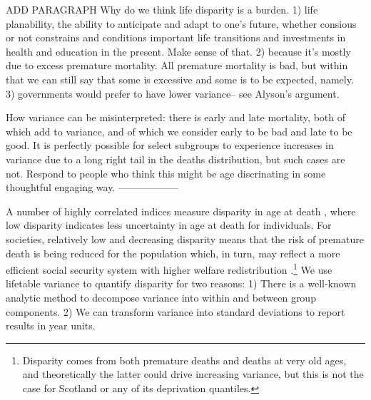 \documentclass[12pt,oneside,a4paper]{article} %
\theoremstyle{definition}
\begin{document}
ADD PARAGRAPH
Why do we think life disparity is a burden. 1) life planability, the ability to
anticipate and adapt to one's future, whether consious or not constrains and
conditions important life transitions and investments in health and education in
the present. Make sense of that. 2) because it's mostly due to excess premature
mortality. All premature mortality is bad, but within that we can still say that
some is excessive and some is to be expected, namely. 3) governments would
prefer to have lower variance-- see Alyson's argument. 

How variance can be misinterpreted: there is early and late mortality, both of
which add to variance, and of which we consider early to be bad and late to be
good. It is perfectly possible for select subgroups to experience increases in
variance due to a long right tail in the deaths distribution, but such cases are
not. Respond to people who think this might be age discrinating in some
thoughtful engaging way.
------------------

A number of highly correlated indices measure disparity in age at
death \citep{Raalte2013}, where low disparity indicates less uncertainty in age
at death for individuals. For societies, relatively low and decreasing disparity
means that the risk of premature death is being reduced for the population which, in turn, may reflect a more efficient social security system with higher welfare redistribution 
\citep{Raalte2012,Bambra2011,Popham2013}.\footnote{Disparity comes from both
premature deaths and deaths at very old ages, and theoretically the latter could
drive increasing variance, but this is not the case for Scotland or any of its
deprivation quantiles.} We use lifetable variance to quantify disparity for
two reasons: 1) There is a well-known analytic method to decompose variance
into within and between group components. 2) We can transform variance into
standard deviations to report results in year units.
 
\end{document}
